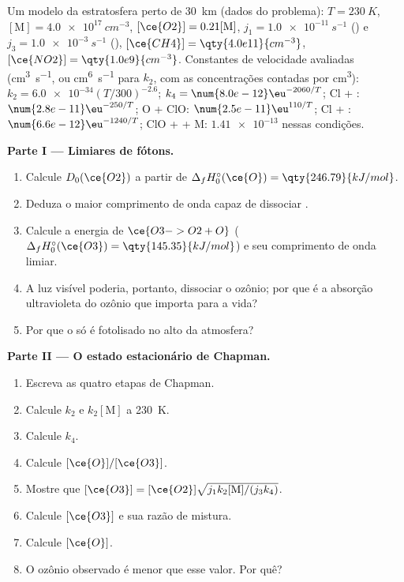 \begin{problem}
\label{pb:b3:photochemistry:1}
Um modelo da estratosfera perto de \qty{30}{km} (dados do problema): $T = \qty{230}{K}$, $[\mathrm M] =
\qty{4.0e17}{cm^{-3}}$, $[\ce{O2}] = 0.21[\mathrm M]$,  $j_1 = \qty{1.0e-11}{s^{-1}}$ ()
e $j_3 = \qty{1.0e-3}{s^{-1}}$ (), $[\ce{CH4}] = \qty{4.0e11}{cm^{-3}}$, $[\ce{NO2}] = \qty{1.0e9}{cm^{-3}}$. Constantes de
velocidade avaliadas (\unit{cm^3.s^{-1}}, ou \unit{cm^6.s^{-1}} para $k_2$, com as concentrações contadas por \unit{cm^3}):
$k_2 = \num{6.0e-34}(T/300)^{-2.6}$; $k_4 = \num{8.0e-12}\eu^{-2060/T}$; Cl + : $\num{2.8e-11}\eu^{-250/T}$;
O + ClO: $\num{2.5e-11}\eu^{110/T}$; Cl + : $\num{6.6e-12}\eu^{-1240/T}$; ClO +  + M: $\num{1.41e-13}$ nessas
condições.

\medskip\noindent\textbf{Parte I --- Limiares de fótons.}
\begin{enumerate}
  \item Calcule $D_0(\ce{O2})$ a partir de $\Delta_fH^\circ_0(\ce{O}) = \qty{246.79}{kJ/mol}$.
  \item Deduza o maior comprimento de onda capaz de dissociar .
  \item Calcule a energia de $\ce{O3 -> O2 + O}$ ($\Delta_fH^\circ_0(\ce{O3}) = \qty{145.35}{kJ/mol}$) e seu
        comprimento de onda limiar.
  \item A luz visível poderia, portanto, dissociar o ozônio; por que é a absorção
        ultravioleta do ozônio que importa para a vida?
  \item Por que o  só é fotolisado no alto da atmosfera?
\end{enumerate}

\medskip\noindent\textbf{Parte II --- O estado estacionário de Chapman.}
\begin{enumerate}[resume]
  \item Escreva as quatro etapas de Chapman.
  \item Calcule $k_2$ e $k_2[\mathrm M]$ a \qty{230}{K}.
  \item Calcule $k_4$.
  \item Calcule $[\ce{O}]/[\ce{O3}]$.
  \item Mostre que $[\ce{O3}] = [\ce{O2}]\sqrt{j_1k_2[\mathrm M]/(j_3k_4)}$.
  \item Calcule $[\ce{O3}]$ e sua razão de mistura.
  \item Calcule $[\ce{O}]$.
  \item O ozônio observado é menor que esse valor. Por quê?
\end{enumerate}


\end{problem}
